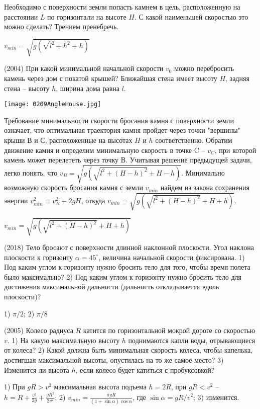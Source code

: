 \begin{ex}
Необходимо с поверхности земли попасть камнем в цель, расположенную на расстоянии $L$ по горизонтали на высоте $H$. С какой наименьшей скоростью это можно сделать? Трением пренебречь.
\begin{ans}
$v_{min} = \sqrt{g \left(\sqrt{l^2 + h^2} + h \right)}$
\end{ans}
\end{ex}

\begin{ex}
(2004) При какой минимальной начальной скорости $v_0$ можно перебросить камень через дом с покатой крышей? 
Ближайшая стена имеет высоту $H$, задняя стена -- высоту $h$, ширина дома равна $l$.
\begin{center}
\texttt{[image: 0209AngleHouse.jpg]}
\end{center}
\begin{sol}
Требование минимальности скорости бросания камня с поверхности земли означает, что оптимальная траектория камня пройдет через точки "вершины" крыши В и С, расположенные на высотах $H$ и $h$ соответственно. Обратим движение камня и определим минимальную скорость в точке C -- $v_C$, при которой камень может перелететь через точку В. Учитывая решение предыдущей задачи, легко понять, что $v_B = \sqrt{g \left(\sqrt{l^2 + (H-h)^2} + H-h \right)}$. Минимально возможную скорость бросания камня с земли $v_{min}$ найдем из закона сохранения энергии $v_{min}^2 = v_B^2 + 2gH$, откуда $v_{min} = \sqrt{g \left(\sqrt{l^2 + (H-h)^2} + H + h \right)}$.
\end{sol}
\begin{ans}
$v_{min} = \sqrt{g \left(\sqrt{l^2 + (H-h)^2} + H + h \right)}$
\end{ans}
\end{ex}

\begin{ex}
(2018) Тело бросают с поверхности длинной наклонной плоскости. Угол наклона плоскости к горизонту $\alpha = 45^{\circ}$, величина начальной скорости фиксирована. 1) Под каким углом к горизонту нужно бросить тело для того, чтобы время полета было максимально? 2) Под каким углом к горизонту нужно бросить тело для достижения максимальной дальности (дальность откладывается вдоль плоскости)?
\begin{ans}
1) $\pi/2$; 2) $\pi/8$
\end{ans}
\end{ex}

\begin{ex}
(2005) Колесо радиуса $R$ катится по горизонтальной мокрой дороге со скоростью $v$. 1) На какую максимальную высоту $h$ поднимаются капли воды, отрывающиеся от колеса? 2) Какой должна быть минимальная скорость колеса, чтобы капелька, достигшая максимальной высоты, опустилась на то же самое место? 3) Изменится ли высота $h$, если колесо будет катиться с пробуксовкой?
\begin{ans}
1) При $gR > v^2$ максимальная высота подъема $h = 2R$, при $gR < v^2$ -- $h = R +\frac{v^2}{2g} + \frac{gR^2}{2v^2}$; 2) $v_{min} = \frac{\pi g R}{(1+ \sin \alpha) \cos \alpha}$, где $\sin \alpha = gR/v^2$; 3) изменится.
\end{ans}
\end{ex}

